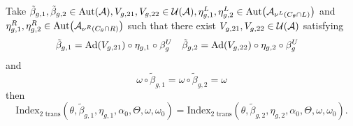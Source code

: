 \documentclass[12pt,a4paper,twoside]{article}
\numberwithin{equation}{section}
\begin{document}
\begin{lemma}\label{lem:InvarianceUnderChoiceBetaTwoTranslations}
	Take $\tilde{\beta}_{g,1},\tilde{\beta}_{g,2}\in\Aut{\AA},V_{g,21},V_{g,22}\in\UU(\AA),\eta_{g,1}^L,\eta_{g,2}^L\in \Aut{\AA_{\nu^{L}(C_\theta\cap L)}}$ and $\eta_{g,1}^R,\eta_{g,2}^R\in \Aut{\AA_{\nu^{R}(C_\theta\cap R)}}$ such that there exist $V_{g,21},V_{g,22}\in\mathcal U(\mathcal A)$ satisfying
	\begin{align}\label{eq:InvarianceUnderChoiceBetaTwoBetasTwoTranslations}
		\tilde{\beta}_{g,1}&=\Ad{V_{g,21}}\circ\eta_{g,1}\circ\beta^U_g&\tilde{\beta}_{g,2}&=\Ad{V_{g,22}}\circ\eta_{g,2}\circ\beta^U_g
	\end{align}
	and
	\begin{equation}
		\omega\circ\tilde{\beta}_{g,1}=\omega\circ\tilde{\beta}_{g,2}=\omega
	\end{equation}
	then
	\begin{equation}
		\textrm{Index}_{\text{2 trans}}(\theta,\tilde{\beta}_{g,1},\eta_{g,1},\alpha_{0},\Theta,\omega,\omega_0)=\textrm{Index}_{\text{2 trans}}(\theta,\tilde{\beta}_{g,2},\eta_{g,2},\alpha_{0},\Theta,\omega,\omega_0).
	\end{equation}
\end{lemma}
\end{document}

